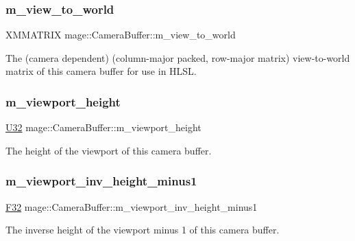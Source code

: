 \subsubsection{\texorpdfstring{m\+\_\+view\+\_\+to\+\_\+world}{m\_view\_to\_world}}
{\footnotesize\ttfamily X\+M\+M\+A\+T\+R\+IX mage\+::\+Camera\+Buffer\+::m\+\_\+view\+\_\+to\+\_\+world}

The (camera dependent) (column-\/major packed, row-\/major matrix) view-\/to-\/world matrix of this camera buffer for use in H\+L\+SL. \hypertarget{structmage_1_1_camera_buffer_a125fd91de1c41cc5bd1a741295bf0536}{}\label{structmage_1_1_camera_buffer_a125fd91de1c41cc5bd1a741295bf0536} 
\subsubsection{\texorpdfstring{m\+\_\+viewport\+\_\+height}{m\_viewport\_height}}
{\footnotesize\ttfamily \hyperlink{namespacemage_a41c104c036fba3756a74e19f793eeaa1}{U32} mage\+::\+Camera\+Buffer\+::m\+\_\+viewport\+\_\+height}

The height of the viewport of this camera buffer. \hypertarget{structmage_1_1_camera_buffer_a05564cd690597c4700ca292c942c0737}{}\label{structmage_1_1_camera_buffer_a05564cd690597c4700ca292c942c0737} 
\subsubsection{\texorpdfstring{m\+\_\+viewport\+\_\+inv\+\_\+height\+\_\+minus1}{m\_viewport\_inv\_height\_minus1}}
{\footnotesize\ttfamily \hyperlink{namespacemage_aa97e833b45f06d60a0a9c4fc22ae02c0}{F32} mage\+::\+Camera\+Buffer\+::m\+\_\+viewport\+\_\+inv\+\_\+height\+\_\+minus1}

The inverse height of the viewport minus 1 of this camera buffer. \hypertarget{structmage_1_1_camera_buffer_a3d56a38eb30fb0f0778d23f61f9988fa}{}\label{structmage_1_1_camera_buffer_a3d56a38eb30fb0f0778d23f61f9988fa} 
